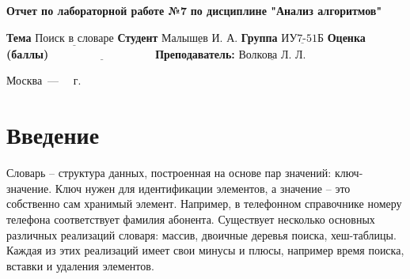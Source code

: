 \documentclass[12pt]{report}
\begin{document}
\begin{titlepage}
	
	\begin{center}
		\noindent\begin{minipage}{1.3\textwidth}\centering
			\Large\textbf{  Отчет по лабораторной работе №7}\newline
			\textbf{по дисциплине "Анализ алгоритмов"}\newline\newline
		\end{minipage}
	\end{center}
	
	\noindent\textbf{Тема} $\underline{\text{Поиск в словаре}}$\newline\newline
	\noindent\textbf{Студент} $\underline{\text{Малышев И. А.}}$\newline\newline
	\noindent\textbf{Группа} $\underline{\text{ИУ7-51Б}}$\newline\newline
	\noindent\textbf{Оценка (баллы)} $\underline{\text{~~~~~~~~~~~~~~~~~~~~~~~~~~~}}$\newline\newline
	\noindent\textbf{Преподаватель: } $\underline{\text{Волкова Л. Л.}}$\newline\newline\newline
	
	\begin{center}
		\vfill
		Москва~---~\the\year
		~г.
	\end{center}
\end{titlepage}


\renewcommand{\contentsname}{Содержание}
\tableofcontents
\setcounter{page}{2}

\newpage
\chapter*{Введение}

Словарь  -- структура данных, построенная  на  основе  пар  значений: ключ-значение.  Ключ нужен для идентификации элементов, а значение -- это собственно сам хранимый элемент. Например, в телефонном справочнике номеру  телефона  соответствует  фамилия  абонента. Существует несколько основных различных реализаций словаря: массив, двоичные деревья поиска, хеш-таблицы. Каждая из этих реализаций имеет свои минусы и плюсы, например время поиска, вставки и удаления элементов.
\end{document}
